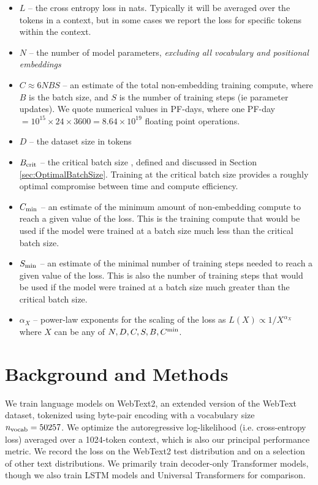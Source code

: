 \begin{itemize}
\item $L$ -- the cross entropy loss in nats.  Typically it will be averaged over the tokens in a context, but in some cases we report the loss for specific tokens within the context.
\item $N$ -- the number of model parameters, \emph{excluding all vocabulary and positional embeddings}  
\item $C \approx 6 N B S$ -- an estimate of the total non-embedding training compute, where $B$ is the batch size, and $S$ is the number of training steps (ie parameter updates). We quote numerical values in PF-days, where one PF-day $ = 10^{15} \times 24 \times 3600 = 8.64 \times 10^{19}$ floating point operations.  
\item $D$ -- the dataset size in tokens \item $B_{\rm crit}$ -- the critical batch size \cite{1812.06162}, defined and discussed in Section \ref{sec:OptimalBatchSize}.  Training at the critical batch size provides a roughly optimal compromise between time and compute efficiency.
\item $C_{\rm min}$ -- an estimate of the minimum amount of non-embedding compute to reach a given value of the loss.  This is the training compute that would be used if the model were trained at a batch size much less than the critical batch size.  
\item $S_{\rm min}$ -- an estimate of the minimal number of training steps needed to reach a given value of the loss.  This is also the number of training steps that would be used if the model were trained at a batch size much greater than the critical batch size.
\item $\alpha_X$ -- power-law exponents for the scaling of the loss as $L(X) \propto 1/X^{\alpha_X}$ where $X$ can be any of $N, D, C, S, B, C^{\rm min}$.
\end{itemize}

\section{Background and Methods}

We train language models on WebText2, an extended version of the WebText \cite{radford2019language} dataset, tokenized using byte-pair encoding \cite{BPE} with a vocabulary size $n_{\rm vocab} = 50257$.  We optimize the autoregressive log-likelihood (i.e. cross-entropy loss) averaged over a 1024-token context, which is also our principal performance metric.  We record the loss on the WebText2 test distribution and on a selection of other text distributions.  We primarily train decoder-only \cite{liu2018generating, radford2018improving} Transformer \cite{OriginalTransformer} models, though we also train LSTM models and Universal Transformers \cite{DBLP:journals/corr/abs-1807-03819}  for comparison.

